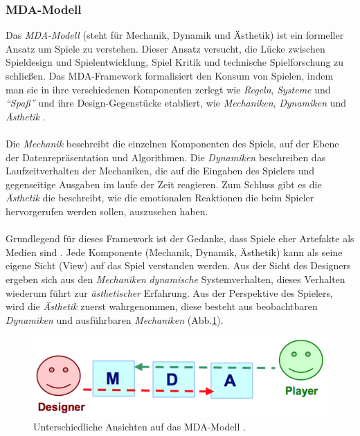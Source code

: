 \documentclass[a4paper,12pt,twoside]{scrartcl}
\begin{document}
\subsubsection{MDA-Modell}
Das \textit{MDA-Modell} (steht für Mechanik, Dynamik und Ästhetik) ist ein formeller Ansatz um Spiele zu verstehen. Dieser Ansatz versucht, die Lücke zwischen Spieldesign und Spielentwicklung, Spiel Kritik und technische Spielforschung zu schließen. Das MDA-Framework formalisiert den Konsum von Spielen, indem man sie in ihre verschiedenen Komponenten zerlegt wie \textit{Regeln}, \textit{Systeme} und \textit{\enquote{Spaß}} und ihre Design-Gegenstücke etabliert, wie \textit{Mechaniken}, \textit{Dynamiken} und \textit{Ästhetik} \cite{Hunicke2004}.
\\\\
Die \textit{Mechanik} beschreibt die einzelnen Komponenten des Spiels, auf der Ebene der Datenrepräsentation und Algorithmen. Die \textit{Dynamiken} beschreiben das Laufzeitverhalten der Mechaniken, die auf die Eingaben des Spielers und gegenseitige Ausgaben im laufe der Zeit reagieren. Zum Schluss gibt es die \textit{Ästhetik} die beschreibt, wie die emotionalen Reaktionen die beim Spieler hervorgerufen werden sollen, auszusehen haben.
\\\\
Grundlegend für dieses Framework ist der Gedanke, dass Spiele eher Artefakte als Medien sind \cite{Hunicke2004}. Jede Komponente (Mechanik, Dynamik, Ästhetik) kann als seine eigene Sicht (View) auf das Spiel verstanden werden. Aus der Sicht des Designers ergeben sich aus den \textit{Mechaniken} \textit{dynamische} Systemverhalten, dieses Verhalten wiederum führt zur \textit{ästhetischer} Erfahrung. Aus der Perspektive des Spielers, wird die \textit{Ästhetik} zuerst wahrgenommen, diese besteht aus beobachtbaren \textit{Dynamiken} und ausführbaren \textit{Mechaniken} (Abb.\ref{MDAModelBild}). 
\begin{figure}[h!]
\begin{center}
\includegraphics[scale = 1.0]{Bilder/MDAModel.eps}
\caption{Unterschiedliche Ansichten auf das MDA-Modell \cite{Hunicke2004}.}
\label{MDAModelBild}
\end{center}
\end{figure}
\end{document}
